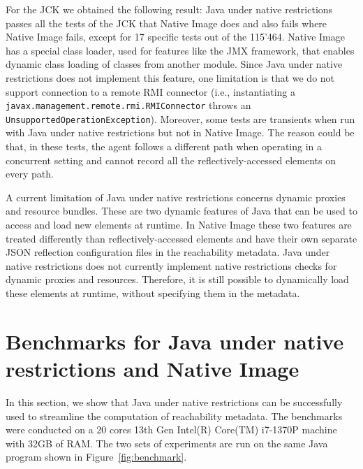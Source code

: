 For the JCK we obtained the following result: Java under native restrictions passes all the tests of the JCK that Native Image does and also fails where Native Image fails, except for 17 specific tests out of the 115'464. Native Image has a special class loader, used for features like the JMX framework, that enables dynamic class loading of classes from another module. Since Java under native restrictions does not implement this feature, one limitation is that we do not support connection to a remote RMI connector (i.e., instantiating a \verb|javax.management.remote.rmi.RMIConnector| throws an \verb|UnsupportedOperationException|). 
Moreover, some tests are transients when run with Java under native restrictions but not in Native Image. The reason could be that, in these tests, the agent follows a different path when operating in a concurrent setting and cannot record all the reflectively-accessed elements on every path. 

A current limitation of Java under native restrictions concerns dynamic proxies and resource bundles. These are two dynamic features of Java that can be used to access and load new elements at runtime. In Native Image these two features are treated differently than reflectively-accessed elements and have their own separate JSON reflection configuration files in the reachability metadata. Java under native restrictions does not currently implement native restrictions checks for dynamic proxies and resources. Therefore, it is still possible to dynamically load these elements at runtime, without specifying them in the metadata. 

\section{Benchmarks for Java under native restrictions and Native Image}\label{benchmark}
In this section, we show that Java under native restrictions can be successfully used to streamline the computation of reachability metadata. The benchmarks were conducted on a 20 cores 13th Gen Intel(R) Core(TM) i7-1370P machine with 32GB of RAM. The two sets of experiments are run on the same Java program shown in Figure~\ref{fig:benchmark}. 

